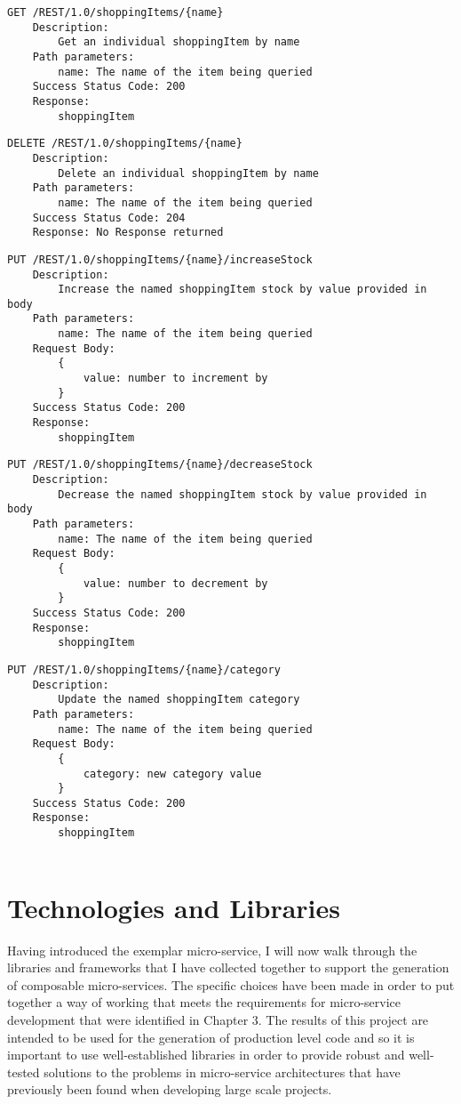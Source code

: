 \begin{verbatim}
GET /REST/1.0/shoppingItems/{name}
    Description:
        Get an individual shoppingItem by name
    Path parameters:
        name: The name of the item being queried
    Success Status Code: 200
    Response:
        shoppingItem
\end{verbatim}\medskip

\begin{verbatim}
DELETE /REST/1.0/shoppingItems/{name}
    Description:
        Delete an individual shoppingItem by name
    Path parameters:
        name: The name of the item being queried
    Success Status Code: 204
    Response: No Response returned
\end{verbatim}\medskip

\begin{verbatim}
PUT /REST/1.0/shoppingItems/{name}/increaseStock
    Description:
        Increase the named shoppingItem stock by value provided in body
    Path parameters:
        name: The name of the item being queried
    Request Body:
        {
            value: number to increment by
        }
    Success Status Code: 200
    Response:
        shoppingItem
\end{verbatim}\medskip

\begin{verbatim}
PUT /REST/1.0/shoppingItems/{name}/decreaseStock
    Description:
        Decrease the named shoppingItem stock by value provided in body
    Path parameters:
        name: The name of the item being queried
    Request Body:
        {
            value: number to decrement by
        }
    Success Status Code: 200
    Response:
        shoppingItem
\end{verbatim}\medskip


\begin{verbatim}
PUT /REST/1.0/shoppingItems/{name}/category
    Description:
        Update the named shoppingItem category
    Path parameters:
        name: The name of the item being queried
    Request Body:
        {
            category: new category value
        }
    Success Status Code: 200
    Response:
        shoppingItem
        
\end{verbatim}\medskip

\section{Technologies and Libraries}

Having introduced the exemplar micro-service, I will now walk through the libraries and frameworks that I have collected together to support the generation of composable micro-services. The specific choices have been made in order to put together a way of working that meets the requirements for micro-service development that were identified in Chapter 3. The results of this project are intended to be used for the generation of production level code and so it is important to use well-established libraries in order to provide robust and well-tested solutions to the problems in micro-service architectures that have previously been found when developing large scale projects.

